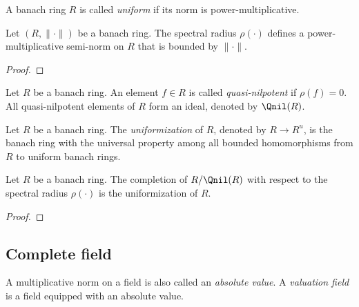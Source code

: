     \begin{definition}\label{def:uniform_banach_ring}
        A banach ring \(R\) is called \emph{uniform} if its norm is power-multiplicative.
    \end{definition}

    \begin{proposition}\label{prop:spectral_radius_defines_a_power-multiplicative_semi-norm}
        Let \((R,\|\cdot\|)\) be a banach ring.
        The spectral radius \(\rho(\cdot)\) defines a power-multiplicative semi-norm on \(R\) that is bounded by \(\|\cdot\|\).
    \end{proposition}
    \begin{proof}
    \end{proof}

    \begin{definition}\label{def:quasi_nilpotent_element}
        Let \(R\) be a banach ring.
        An element \(f \in R\) is called \emph{quasi-nilpotent} if \(\rho(f) = 0\).
        All quasi-nilpotent elements of \(R\) form an ideal, denoted by \(\Qnil(R)\).
    \end{definition}

    \begin{definition}\label{def:uniformization_of_banach_rings}
        Let \(R\) be a banach ring.
        The \emph{uniformization} of \(R\), denoted by \(R \to R^u\), is the banach ring with the universal property among all bounded homomorphisms from \(R\) to uniform banach rings.
    \end{definition}

    \begin{proposition}\label{prop:the_uniformization_of_banach_rings_given_by_spectral_radius}
        Let \(R\) be a banach ring.
        The completion of \(R/\Qnil(R)\) with respect to the spectral radius \(\rho(\cdot)\) is the uniformization of \(R\).
    \end{proposition}
    \begin{proof}
    \end{proof}



\subsection{Complete field}

    \begin{definition}\label{def:valuation_field}
        A multiplicative norm on a field is also called an \emph{absolute value}.
        A \emph{valuation field} is a field equipped with an absolute value.
    \end{definition}

